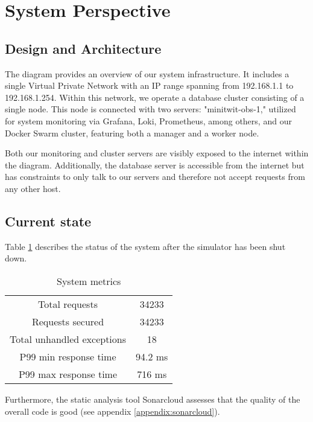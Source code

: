 \section{System Perspective}

\subsection{Design and Architecture}
The diagram provides an overview of our system infrastructure. It includes a single Virtual Private Network with an IP range spanning from 192.168.1.1 to 192.168.1.254. Within this network, we operate a database cluster consisting of a single node. This node is connected with two servers: "minitwit-obs-1," utilized for system monitoring via Grafana, Loki, Prometheus, among others, and our Docker Swarm cluster, featuring both a manager and a worker node.

Both our monitoring and cluster servers are visibly exposed to the internet within the diagram. Additionally, the database server is accessible from the internet but has constraints to only talk to our servers and therefore not accept requests from any other host.




\subsection{Current state}
Table \ref{current-table} describes the status of the system after the simulator has been shut down.
\begin{table}[H]
    \begin{center}
        \begin{tabular}{ |c|c| }
            \hline
            Total requests & 34233 \\
            Requests secured & 34233 \\
            Total unhandled exceptions & 18 \\
            P99 min response time & 94.2 ms \\
            P99 max response time & 716 ms \\
            \hline
        \end{tabular}
    \end{center}
    \caption{System metrics}
    \label{current-table}
\end{table}
Furthermore, the static analysis tool Sonarcloud assesses that the quality of the overall code is good (see appendix \ref{appendix:sonarcloud}).
